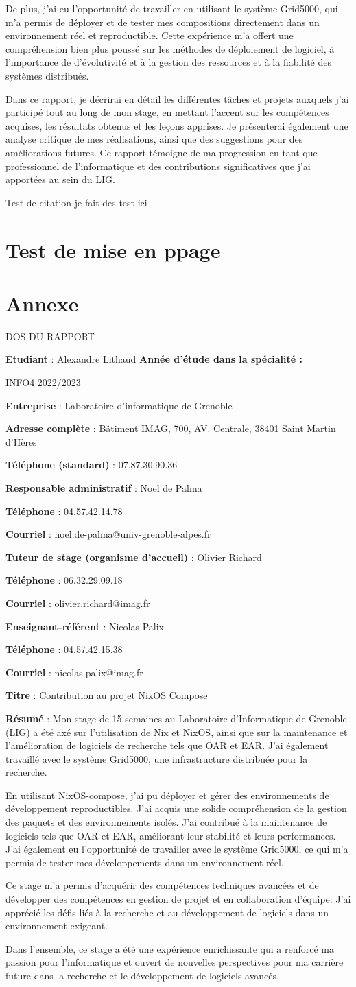 \documentclass[a4paper,french,12pt, titlepage]{article}
\makeatletter
\newcommand{\makefooter}{%
  \makefooterhooka
}
\newcommand{\makefooterhooka}{%
    \begin{center}
        \begin{Large}
        DOS DU RAPPORT
        \end{Large}
    \end{center}
    
    
    \textbf{Etudiant} : Alexandre Lithaud
    \hfill \textbf{Année d’étude dans la spécialité :}
    
    \hfill INFO4 2022/2023
    
    \hfill
    
    \textbf{Entreprise} : Laboratoire d'informatique de Grenoble 

    \textbf{Adresse complète} : Bâtiment IMAG, 700, AV. Centrale, 38401
Saint Martin d'Hères

    \textbf{Téléphone (standard)} : 07.87.30.90.36
    
    \hfill
    
    \textbf{Responsable administratif} : Noel de Palma 

    \textbf{Téléphone} : 04.57.42.14.78

    \textbf{Courriel} : noel.de-palma@univ-grenoble-alpes.fr

    \hfill
    
    \textbf{Tuteur de stage (organisme d’accueil)} : Olivier Richard

    \textbf{Téléphone} : 06.32.29.09.18

    \textbf{Courriel} : olivier.richard@imag.fr
    
    \hfill
    
    \textbf{Enseignant-référent} : Nicolas Palix

    \textbf{Téléphone} : 04.57.42.15.38 

    \textbf{Courriel} : nicolas.palix@imag.fr 

    \hfill
    
    \textbf{Titre} : Contribution au projet NixOS Compose
    
    \hfill

    \textbf{Résumé} : Mon stage de 15 semaines au Laboratoire
d'Informatique de Grenoble (LIG) a été axé sur l'utilisation de Nix et
NixOS, ainsi que sur la maintenance et l'amélioration de logiciels de
recherche tels que OAR et EAR. J'ai également travaillé avec le système
Grid5000, une infrastructure distribuée pour la recherche.\newline

En utilisant NixOS-compose, j'ai pu déployer et gérer des environnements
de développement reproductibles. J'ai acquis une solide compréhension de
la gestion des paquets et des environnements isolés. J'ai contribué à la
maintenance de logiciels tels que OAR et EAR, améliorant leur stabilité
et leurs performances. J'ai également eu l'opportunité de travailler
avec le système Grid5000, ce qui m'a permis de tester mes développements
dans un environnement réel.\newline

Ce stage m'a permis d'acquérir des compétences techniques avancées et de
développer des compétences en gestion de projet et en collaboration
d'équipe. J'ai apprécié les défis liés à la recherche et au
développement de logiciels dans un environnement exigeant.\newline

Dans l'ensemble, ce stage a été une expérience enrichissante qui a
renforcé ma passion pour l'informatique et ouvert de nouvelles
perspectives pour ma carrière future dans la recherche et le
développement de logiciels avancés.
}
\makeatother
\begin{document}
De plus, j'ai eu l'opportunité de travailler en utilisant le système
Grid5000, qui m'a permis de déployer et de tester mes compositions
directement dans un environnement réel et reproductible. Cette
expérience m'a offert une compréhension bien plus poussé sur les
méthodes de déploiement de logiciel, à l'importance de d'évolutivité et
à la gestion des ressources et à la fiabilité des systèmes
distribués.\newline

Dans ce rapport, je décrirai en détail les différentes tâches et projets
auxquels j'ai participé tout au long de mon stage, en mettant l'accent
sur les compétences acquises, les résultats obtenus et les leçons
apprises. Je présenterai également une analyse critique de mes
réalisations, ainsi que des suggestions pour des améliorations futures.
Ce rapport témoigne de ma progression en tant que professionnel de
l'informatique et des contributions significatives que j'ai apportées au
sein du LIG.\newline

Test de citation \cite{grid5000} je fait des test ici\newline

\newpage

\hypertarget{test-de-mise-en-ppage}{%
\section{Test de mise en ppage}\label{test-de-mise-en-ppage}}

\newpage

\hypertarget{annexe}{%
\section{Annexe}\label{annexe}}

\listoffigures

\printbibliography

\begin{titlingpage}
\newpage
\makefooter
\end{titlingpage}
\end{document}
